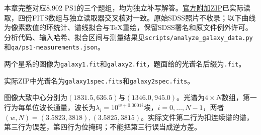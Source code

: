 本章完整对应8.902 PS1的三个题组，均为独立补写解答。\href{https://ocw.mit.edu/courses/8-902-astrophysics-ii-fall-2023/mit8_902_f23_problem_set_1_additional_files.zip}{官方附加ZIP}已实际读取，四份FITS数组与独立读取器交叉核对一致。原始SDSS照片不收录；以下曲线为像素数值的环统计、谱线拟合与TeX重绘，保留SDSS署名和原文件例外许可。分析代码、输入哈希、拟合区间与测量结果见\texttt{scripts/analyze\_galaxy\_data.py}和\texttt{qa/ps1-measurements.json}。

两个星系的图像为\texttt{galaxy1.fit}和\texttt{galaxy2.fit}，题面给的光谱名后缀为\texttt{.fit}。

实际ZIP中光谱名为\texttt{galaxy1spec.fits}和\texttt{galaxy2spec.fits}。

图像大致中心分别为$(1831.5,636.5)$与$(1346.0,945.0)$。光谱为$4\times N$数组，第一行为每单位波长通量，波长为$\lambda_i=10^{w+0.0001i}$埃，$i=0,\ldots,N-1$，两者$(w,N)=(3.5823,3818),(3.5825,3815)$。实际文件第二行为扣连续谱的谱，第三行为误差，第四行为位掩码；不能把第三行误当成逆方差。

